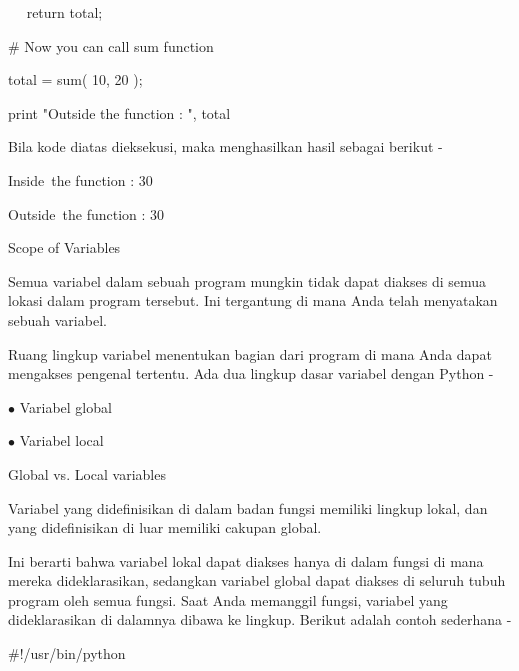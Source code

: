 \noindent 
 \hspace*{0.5in} ~~ return total; \par
\vspace{12pt}
\noindent 
 \hspace*{0.5in}  $  \#  $ Now you can call sum function \par
\noindent 
 \hspace*{0.5in} total = sum( 10, 20 ); \par
\noindent 
 \hspace*{0.5in} print "Outside the function : ", total  \par
\noindent 
Bila kode diatas dieksekusi, maka menghasilkan hasil sebagai berikut - \par
\noindent 
 \hspace*{0.5in} Inside~the function :  30 \par
\noindent 
 \hspace*{0.5in} Outside~the function :  30 \par
\noindent 
Scope of Variables \par
\noindent 
Semua variabel dalam sebuah program mungkin tidak dapat diakses di semua lokasi dalam program tersebut. Ini tergantung di mana Anda telah menyatakan sebuah variabel. \par
\noindent 
Ruang lingkup variabel menentukan bagian dari program di mana Anda dapat mengakses pengenal tertentu. Ada dua lingkup dasar variabel dengan Python - \par
\noindent 
 \hspace*{0.5in}  $ \bullet $ Variabel global \par
\noindent 
 \hspace*{0.5in}  $ \bullet $ Variabel local \par
\vspace{12pt}
\noindent 
Global vs. Local variables \par
\noindent 
Variabel yang didefinisikan di dalam badan fungsi memiliki lingkup lokal, dan yang didefinisikan di luar memiliki cakupan global. \par
\noindent 
Ini berarti bahwa variabel lokal dapat diakses hanya di dalam fungsi di mana mereka dideklarasikan, sedangkan variabel global dapat diakses di seluruh tubuh program oleh semua fungsi. Saat Anda memanggil fungsi, variabel yang dideklarasikan di dalamnya dibawa ke lingkup. Berikut adalah contoh sederhana - \par
\noindent 
 \hspace*{0.5in}  $  \#  $!/usr/bin/python \par
